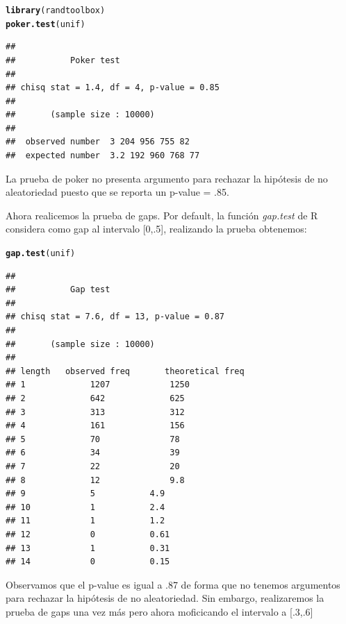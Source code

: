 \documentclass[12 pt]{article}\usepackage[]{graphicx}\usepackage[]{color}
\makeatletter
\newcommand{\hlstd}[1]{\textcolor[rgb]{0.345,0.345,0.345}{#1}}%
\newcommand{\hlkwd}[1]{\textcolor[rgb]{0.737,0.353,0.396}{\textbf{#1}}}%
\newenvironment{kframe}{%
 \def\at@end@of@kframe{}%
 \ifinner\ifhmode%
  \def\at@end@of@kframe{\end{minipage}}%
  \begin{minipage}{\columnwidth}%
 \fi\fi%
 \def\FrameCommand##1{\hskip\@totalleftmargin \hskip-\fboxsep
 \colorbox{shadecolor}{##1}\hskip-\fboxsep
     \hskip-\linewidth \hskip-\@totalleftmargin \hskip\columnwidth}%
 \MakeFramed {\advance\hsize-\width
   \@totalleftmargin\z@ \linewidth\hsize
   \@setminipage}}%
 {\par\unskip\endMakeFramed%
 \at@end@of@kframe}
\newenvironment{knitrout}{}{} %
\makeatother
\begin{document}
\begin{enumerate}
\begin{knitrout}
\color{fgcolor}\begin{kframe}
\begin{alltt}
\hlkwd{library}\hlstd{(randtoolbox)}
\hlkwd{poker.test}\hlstd{(unif)}
\end{alltt}
\begin{verbatim}
## 
## 			 Poker test
## 
## chisq stat = 1.4, df = 4, p-value = 0.85
## 
## 		 (sample size : 10000)
## 
## 	observed number	 3 204 956 755 82 
## 	expected number	 3.2 192 960 768 77
\end{verbatim}
\end{kframe}
\end{knitrout}

La prueba de poker no presenta argumento para rechazar la hipótesis de no aleatoriedad puesto que se reporta un p-value = .85.

Ahora realicemos la prueba de gaps. Por default, la función \textit{gap.test} de R considera como gap al intervalo [0,.5], realizando la prueba obtenemos:

\begin{knitrout}
\color{fgcolor}\begin{kframe}
\begin{alltt}
\hlkwd{gap.test}\hlstd{(unif)}
\end{alltt}
\begin{verbatim}
## 
## 			 Gap test
## 
## chisq stat = 7.6, df = 13, p-value = 0.87
## 
## 		 (sample size : 10000)
## 
## length	observed freq		theoretical freq
## 1 			 1207 			 1250 
## 2 			 642 			 625 
## 3 			 313 			 312 
## 4 			 161 			 156 
## 5 			 70 			 78 
## 6 			 34 			 39 
## 7 			 22 			 20 
## 8 			 12 			 9.8 
## 9 			 5 			 4.9 
## 10 			 1 			 2.4 
## 11 			 1 			 1.2 
## 12 			 0 			 0.61 
## 13 			 1 			 0.31 
## 14 			 0 			 0.15
\end{verbatim}
\end{kframe}
\end{knitrout}

Observamos que el p-value es igual a .87 de forma que no tenemos argumentos para rechazar la hipótesis de no aleatoriedad. Sin embargo, realizaremos la prueba de gaps una vez más pero ahora moficicando el intervalo a [.3,.6]


\end{enumerate}
\end{document}

